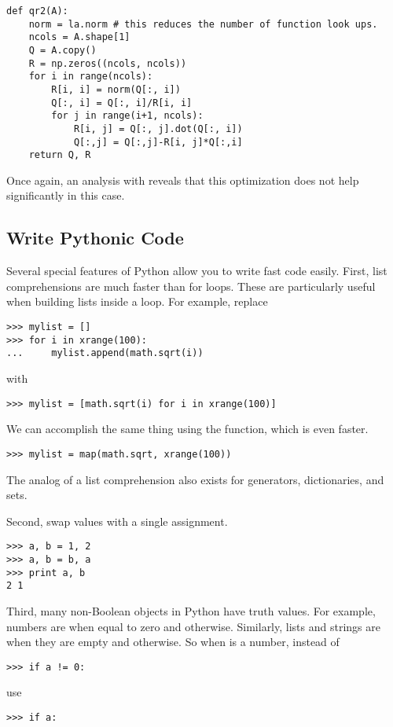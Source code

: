 \begin{lstlisting}
def qr2(A):
    norm = la.norm # this reduces the number of function look ups.
    ncols = A.shape[1]
    Q = A.copy()
    R = np.zeros((ncols, ncols))
    for i in range(ncols):
        R[i, i] = norm(Q[:, i])
        Q[:, i] = Q[:, i]/R[i, i]
        for j in range(i+1, ncols):
            R[i, j] = Q[:, j].dot(Q[:, i])
            Q[:,j] = Q[:,j]-R[i, j]*Q[:,i]
    return Q, R
\end{lstlisting}
Once again, an analysis with  reveals that this optimization does not help significantly in this case.


\subsection*{Write Pythonic Code}
Several special features of Python allow you to write fast code easily.
First, list comprehensions are much faster than for loops. These are particularly useful when building lists inside a loop.
For example, replace
\begin{lstlisting}
>>> mylist = []
>>> for i in xrange(100):
...     mylist.append(math.sqrt(i))
\end{lstlisting}
with
\begin{lstlisting}
>>> mylist = [math.sqrt(i) for i in xrange(100)]
\end{lstlisting}
We can accomplish the same thing using the  function, which is even faster.
\begin{lstlisting}
>>> mylist = map(math.sqrt, xrange(100))
\end{lstlisting}
The analog of a list comprehension also exists for generators, dictionaries, and sets.

Second, swap values with a single assignment.
\begin{lstlisting}
>>> a, b = 1, 2
>>> a, b = b, a
>>> print a, b
2 1
\end{lstlisting}

Third, many non-Boolean objects in Python have truth values.
For example, numbers are  when equal to zero and  otherwise.
Similarly, lists and strings are  when they are empty and  otherwise.
So when  is a number, instead of
\begin{lstlisting}
>>> if a != 0:
\end{lstlisting}
use
\begin{lstlisting}
>>> if a:
\end{lstlisting}

